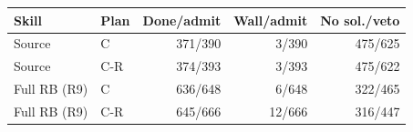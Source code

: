 \begin{tabular}{llrrr}
\toprule
Skill & Plan & Done/admit & Wall/admit & No sol./veto \\
\midrule
Source & C & 371/390 & 3/390 & 475/625 \\
Source & C-R & 374/393 & 3/393 & 475/622 \\
Full RB (R9) & C & 636/648 & 6/648 & 322/465 \\
Full RB (R9) & C-R & 645/666 & 12/666 & 316/447 \\
\bottomrule
\end{tabular}
